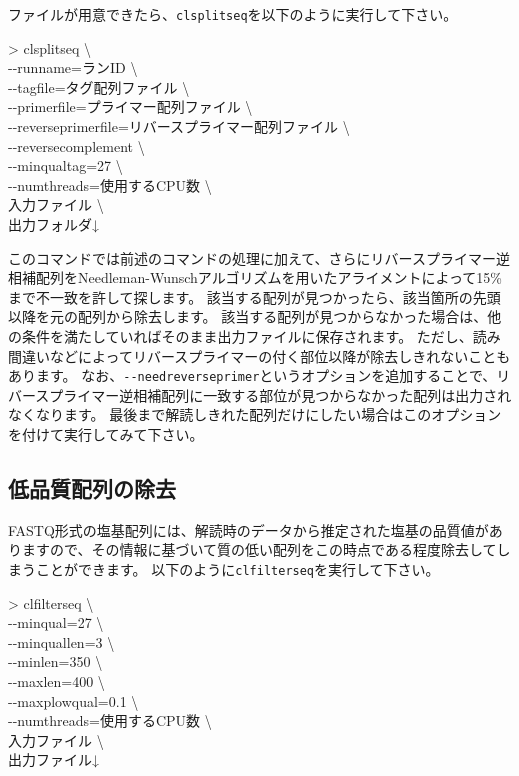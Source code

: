 \documentclass[titlepage,10pt,a4paper]{jsbook}
\newenvironment{cmd}{\begin{oframed}\raggedright\ttfamily\footnotesize\setlength{\baselineskip}{1.4em}}{\end{oframed}\vspace{-1em}}
\begin{document}
ファイルが用意できたら、\texttt{clsplitseq}を以下のように実行して下さい。
\begin{cmd}
{\textgreater} clsplitseq {\textbackslash}\\
{-}{-}runname=ランID {\textbackslash}\\
{-}{-}tagfile=タグ配列ファイル {\textbackslash}\\
{-}{-}primerfile=プライマー配列ファイル {\textbackslash}\\
{-}{-}reverseprimerfile=リバースプライマー配列ファイル {\textbackslash}\\
{-}{-}reversecomplement {\textbackslash}\\
{-}{-}minqualtag=27 {\textbackslash}\\
{-}{-}numthreads=使用するCPU数 {\textbackslash}\\
入力ファイル {\textbackslash}\\
出力フォルダ↓
\end{cmd}
このコマンドでは前述のコマンドの処理に加えて、さらにリバースプライマー逆相補配列をNeedleman-Wunschアルゴリズムを用いたアライメントによって15\%まで不一致を許して探します。
該当する配列が見つかったら、該当箇所の先頭以降を元の配列から除去します。
該当する配列が見つからなかった場合は、他の条件を満たしていればそのまま出力ファイルに保存されます。
ただし、読み間違いなどによってリバースプライマーの付く部位以降が除去しきれないこともあります。
なお、\texttt{{-}{-}needreverseprimer}というオプションを追加することで、リバースプライマー逆相補配列に一致する部位が見つからなかった配列は出力されなくなります。
最後まで解読しきれた配列だけにしたい場合はこのオプションを付けて実行してみて下さい。

\subsection{低品質配列の除去}\label{subsection:qualityfilteringfor454}

FASTQ形式の塩基配列には、解読時のデータから推定された塩基の品質値がありますので、その情報に基づいて質の低い配列をこの時点である程度除去してしまうことができます。
以下のように\texttt{clfilterseq}を実行して下さい。

\begin{cmd}
{\textgreater} clfilterseq {\textbackslash}\\
{-}{-}minqual=27 {\textbackslash}\\
{-}{-}minquallen=3 {\textbackslash}\\
{-}{-}minlen=350 {\textbackslash}\\
{-}{-}maxlen=400 {\textbackslash}\\
{-}{-}maxplowqual=0.1 {\textbackslash}\\
{-}{-}numthreads=使用するCPU数 {\textbackslash}\\
入力ファイル {\textbackslash}\\
出力ファイル↓
\end{cmd}
\end{document}
